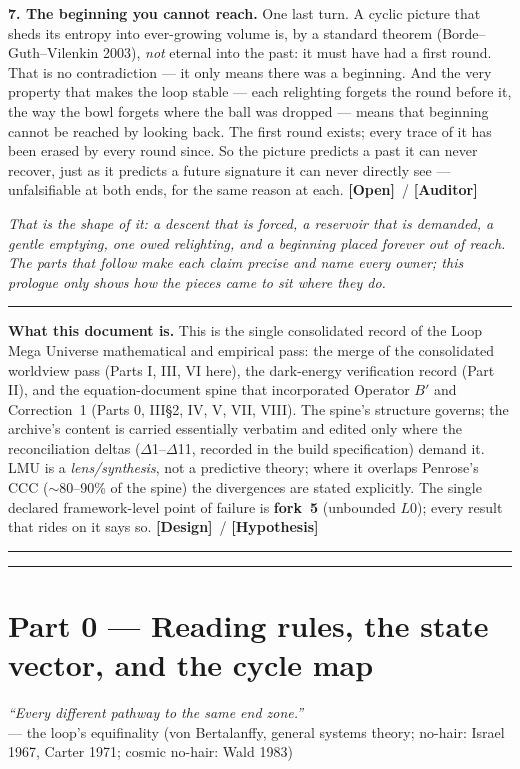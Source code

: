 \documentclass[11pt]{article}
\newcommand{\Hyp}{\textbf{\textcolor{blue!55!black}{[Hypothesis]}}}
\newcommand{\Design}{\textbf{\textcolor{purple!65!black}{[Design]}}}
\newcommand{\Open}{\textbf{\textcolor{gray!10!black}{[Open]}}}
\newcommand{\Auditor}{\textbf{\textcolor{teal!55!black}{[Auditor]}}}
\begin{document}
\noindent\textbf{7. The beginning you cannot reach.} One last turn. A cyclic picture that sheds its entropy into ever-growing volume is, by a standard theorem (Borde--Guth--Vilenkin 2003), \emph{not} eternal into the past: it must have had a first round. That is no contradiction --- it only means there was a beginning. And the very property that makes the loop stable --- each relighting forgets the round before it, the way the bowl forgets where the ball was dropped --- means that beginning cannot be reached by looking back. The first round exists; every trace of it has been erased by every round since. So the picture predicts a past it can never recover, just as it predicts a future signature it can never directly see --- unfalsifiable at both ends, for the same reason at each. \Open\ / \Auditor

\medskip
\noindent\emph{That is the shape of it: a descent that is forced, a reservoir that is demanded, a gentle emptying, one owed relighting, and a beginning placed forever out of reach. The parts that follow make each claim precise and name every owner; this prologue only shows how the pieces came to sit where they do.}

\vspace{6pt}\hrule\vspace{8pt}

\noindent\textbf{What this document is.} This is the single consolidated record of the Loop Mega Universe mathematical and empirical pass: the merge of the consolidated worldview pass (Parts I, III, VI here), the dark-energy verification record (Part II), and the equation-document spine that incorporated Operator $B'$ and Correction~1 (Parts 0, III\S2, IV, V, VII, VIII). The spine's structure governs; the archive's content is carried essentially verbatim and edited only where the reconciliation deltas ($\Delta$1--$\Delta$11, recorded in the build specification) demand it. LMU is a \emph{lens/synthesis}, not a predictive theory; where it overlaps Penrose's CCC ($\sim$80--90\% of the spine) the divergences are stated explicitly. The single declared framework-level point of failure is \textbf{fork~5} (unbounded $L0$); every result that rides on it says so. \Design\ / \Hyp
\vspace{4pt}\hrule\vspace{4pt}
\tableofcontents
\vspace{4pt}\hrule\vspace{8pt}

\part*{Part 0 --- Reading rules, the state vector, and the cycle map}
\begin{flushright}\small\emph{``Every different pathway to the same end zone.''}\\[-1pt]{\footnotesize --- the loop's equifinality (von Bertalanffy, general systems theory; no-hair: Israel 1967, Carter 1971; cosmic no-hair: Wald 1983)}\end{flushright}
\setcounter{section}{0}\setcounter{equation}{0}\setcounter{figure}{0}
\end{document}
